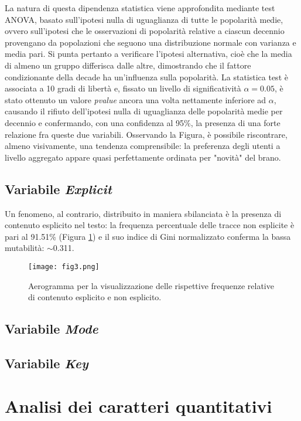 \documentclass[fleqn,10pt]{SelfArx} %
\begin{document}
La natura di questa dipendenza statistica viene approfondita mediante test ANOVA, basato sull'ipotesi nulla di uguaglianza di tutte le popolarità medie, ovvero sull'ipotesi che le osservazioni di popolarità relative a ciascun decennio provengano da popolazioni che seguono una distribuzione normale con varianza e media pari. Si punta pertanto a verificare l'ipotesi alternativa, cioè che la media di almeno un gruppo differisca dalle altre, dimostrando che il fattore condizionante della decade ha un'influenza sulla popolarità. La statistica test è associata a 10 gradi di libertà e, fissato un livello di significatività $\alpha=0.05$, è stato ottenuto un valore \textit{pvalue} ancora una volta nettamente inferiore ad $\alpha$, causando il rifiuto dell'ipotesi nulla di uguaglianza delle popolarità medie per decennio e confermando, con una confidenza al 95\%, la presenza di una forte relazione fra queste due variabili. Osservando la Figura, è possibile riscontrare, almeno visivamente, una tendenza comprensibile: la preferenza degli utenti a livello aggregato appare quasi perfettamente ordinata per "novità" del brano.
\subsection*{Variabile \textit{Explicit}}
Un fenomeno, al contrario, distribuito in maniera sbilanciata è la presenza di contenuto esplicito nel testo: la frequenza percentuale delle tracce non esplicite è pari al 91.51\% (Figura \ref{fig:fig3}) e il suo indice di Gini normalizzato conferma la bassa mutabilità: $\sim$0.311. 
\begin{figure}[H]
    \centering
    \texttt{[image: fig3.png]}
    \label{fig:fig3}
    \caption{Aerogramma per la visualizzazione delle rispettive frequenze relative di contenuto esplicito e non esplicito.}
\end{figure}  
\subsection*{Variabile \textit{Mode}}
\subsection*{Variabile \textit{Key}}
\section{Analisi dei caratteri quantitativi}\label{cquant}
\end{document}
